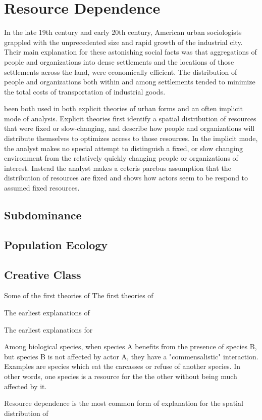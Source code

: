 \section*{Resource Dependence} 
In the late 19th century and early 20th century, American urban
sociologists grappled with the unprecedented size and rapid growth of
the industrial city. Their main explanation for these astonishing
social facts was that aggregations of people and organizations into
dense settlements and the locations of those settlements across the
land, were economically efficient. The distribution of people and
organizations both within and among settlements tended to minimize the
total costs of transportation of industrial goods.





 been both used in both explicit theories of
urban forms and an often implicit mode of analysis. Explicit theories
first identify a spatial distribution of resources that were fixed or
slow-changing, and describe how people and organizations will
distribute themselves to optimizes access to those resources. In the
implicit mode, the analyst makes no special attempt to distinguish a
fixed, or slow changing environment from the relatively quickly
changing people or organizations of interest. Instead the analyst
makes a ceteris parebus assumption that the distribution of resources
are fixed and shows how actors seem to be respond to assumed fixed resources.



\subsection*{Subdominance}

\subsection*{Population Ecology}

\subsection*{Creative Class}

Some of the first theories of The first theories of 

The earliest explanations of 

The earliest explanations for 


Among biological species, when species A benefits from the presence of
species B, but species B is not affected by actor A, they have a
"commensalistic" interaction. Examples are species which eat the
carcasses or refuse of another species. In other words, one species is
a resource for the the other without being much affected by it. 

Resource dependence is the most common form of explanation for the
spatial distribution of



